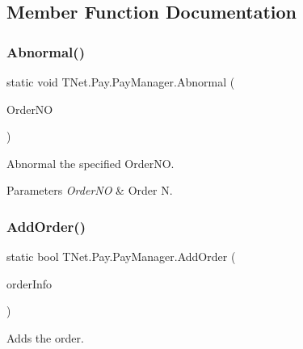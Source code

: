 \subsection{Member Function Documentation}
\mbox{\label{class_t_net_1_1_pay_1_1_pay_manager_a194666a9e9d3e886a13ea097c88d9214}} 
\subsubsection{\texorpdfstring{Abnormal()}{Abnormal()}}
{\footnotesize\ttfamily static void T\+Net.\+Pay.\+Pay\+Manager.\+Abnormal (\begin{DoxyParamCaption}\item[{string}]{Order\+NO }\end{DoxyParamCaption})\hspace{0.3cm}{\ttfamily [static]}}



Abnormal the specified Order\+NO. 


\begin{DoxyParams}{Parameters}
{\em Order\+NO} & Order N.\\
\hline
\end{DoxyParams}
\mbox{\label{class_t_net_1_1_pay_1_1_pay_manager_ab1aa823b8ab62c631d85e88a88ca7076}} 
\subsubsection{\texorpdfstring{Add\+Order()}{AddOrder()}}
{\footnotesize\ttfamily static bool T\+Net.\+Pay.\+Pay\+Manager.\+Add\+Order (\begin{DoxyParamCaption}\item[{\mbox{\hyperlink{class_t_net_1_1_pay_1_1_order_info}{Order\+Info}}}]{order\+Info }\end{DoxyParamCaption})\hspace{0.3cm}{\ttfamily [static]}}



Adds the order. 

